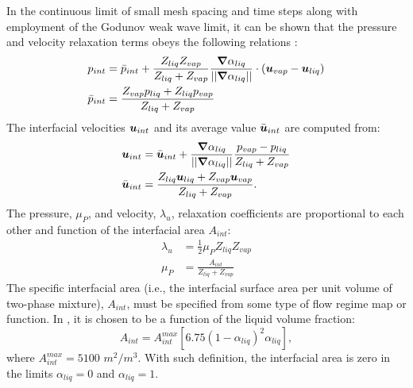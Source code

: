 In the continuous limit of small mesh spacing and time steps along with employment of the Godunov weak wave limit, it can be shown that the pressure and velocity relaxation terms obeys the following relations \cite{Berry_2008b, Chinnayya_2004}:
%
\begin{align}
  \label{E-R:83}
  p_{int} &= \bar{p}_{int} + \frac{Z_{liq}Z_{vap}}{Z_{liq}+Z_{vap}} \frac{\boldsymbol{\nabla} \alpha_{liq}}{|| \boldsymbol{\nabla} \alpha_{liq} ||} \cdot (\boldsymbol u_{vap}-\boldsymbol u_{liq})
  \\
  \bar{p}_{int} &= \frac{Z_{vap}p_{liq}+Z_{liq}p_{vap}}{Z_{liq}+Z_{vap}}
\end{align}
%
The interfacial velocities $\boldsymbol u_{int}$ and its average value $\bar{\boldsymbol u}_{int}$ are computed from:
%
\begin{align}
  \label{E-R:84}
  \boldsymbol u_{int} &= \bar{\boldsymbol u}_{int} +  \frac{\boldsymbol{\nabla} \alpha_{liq}}{|| \boldsymbol{\nabla} \alpha_{liq} ||} \frac{p_{vap}-p_{liq}}{Z_{liq}+Z_{vap}}
  \\
  \bar{\boldsymbol u}_{int} &= \frac{Z_{liq} \boldsymbol u_{liq}+Z_{vap}\boldsymbol u_{vap}}{Z_{liq}+Z_{vap}}.
\end{align}
%
The pressure, $\mu_P$, and velocity, $\lambda_u$, relaxation coefficients are proportional to each other and function of the interfacial area $A_{int}$:
%
\begin{align}
  \label{E-R:85}
  \lambda_u &= \frac{1}{2} \mu_P Z_{liq} Z_{vap}
  \\
  \label{E-R:86}
  \mu_P &= \frac{A_{int}}{Z_{liq}+Z_{vap}}
\end{align}
The specific interfacial area (i.e., the interfacial surface area per unit
volume of two-phase mixture), $A_{int}$, must be specified from some type of
flow regime map or function. In \cite{SEM}, it is chosen to be a function of the liquid volume fraction:
%
\begin{equation}\label{eq:Aint-sect4}
A_{int} = A_{int}^{max} \left[ 6.75 \left(1-\alpha_{liq} \right)^2 \alpha_{liq} \right],
\end{equation}
% 
where $A_{int}^{max} = 5100$ $m^2 / m^3$. With such definition, the interfacial area is zero in the limits $\alpha_{liq} = 0$ and $\alpha_{liq} = 1$. 
